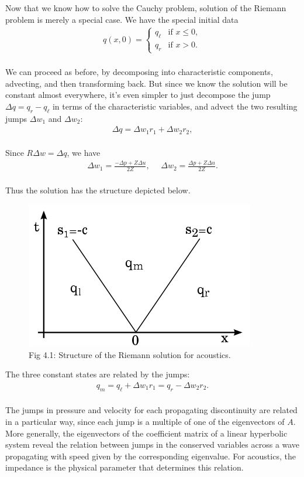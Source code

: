 \documentclass{SIAMbook2016}
\makeatletter
\def\maxwidth{\ifdim\Gin@nat@width>\linewidth\linewidth
    \else\Gin@nat@width\fi}
\let\Oldincludegraphics\includegraphics
\renewcommand{\includegraphics}[1]{\Oldincludegraphics[width=.8\maxwidth]{#1}}
\makeatother
\begin{document}
Now that we know how to solve the Cauchy problem, solution of the
Riemann problem is merely a special case. We have the special initial
data\\
\begin{align*}
q(x,0) = \begin{cases}
q_\ell & \text{if   } x \le 0, \\
q_r & \text{if   } x > 0.
\end{cases}
\end{align*}\\
We can proceed as before, by decomposing into characteristic components,
advecting, and then transforming back. But since we know the solution
will be constant almost everywhere, it's even simpler to just decompose
the jump \(\Delta q = q_r - q_\ell\) in terms of the characteristic
variables, and advect the two resulting jumps \(\Delta w_1\) and
\(\Delta w_2\):\\
\begin{align*}
\Delta q = \Delta w_1 r_1 + \Delta w_2 r_2,
\end{align*}\\
Since \(R\Delta w = \Delta q\), we have\\
\begin{align*}
\Delta w_1 = \frac{-\Delta p + Z\Delta u}{2Z}, \ \ \ \ \ \
\Delta w_2 = \frac{\Delta p + Z\Delta u}{2Z}.
\end{align*}\\
Thus the solution has the structure depicted below.

\begin{figure}
\centering
\includegraphics{./figures/acoustics_xt_plane.png}
\caption{Fig 4.1: Structure of the Riemann solution for acoustics.}
\end{figure}

The three constant states are related by the jumps:\\
\begin{align}
q_m = q_\ell + \Delta w_1 r_1 = q_r - \Delta w_2 r_2.
\label{eq:acussol}
\end{align}\\
The jumps in pressure and velocity for each propagating discontinuity
are related in a particular way, since each jump is a multiple of one of
the eigenvectors of \(A\). More generally, the eigenvectors of the
coefficient matrix of a linear hyperbolic system reveal the relation
between jumps in the conserved variables across a wave propagating with
speed given by the corresponding eigenvalue. For acoustics, the
impedance is the physical parameter that determines this relation.
\end{document}
